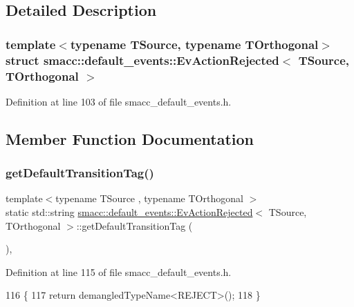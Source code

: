 \subsection{Detailed Description}
\subsubsection*{template$<$typename T\+Source, typename T\+Orthogonal$>$\newline
struct smacc\+::default\+\_\+events\+::\+Ev\+Action\+Rejected$<$ T\+Source, T\+Orthogonal $>$}



Definition at line 103 of file smacc\+\_\+default\+\_\+events.\+h.



\subsection{Member Function Documentation}
\mbox{\label{structsmacc_1_1default__events_1_1EvActionRejected_ad7fcf7986d66cee47b34db537fc17310}} 
\subsubsection{\texorpdfstring{get\+Default\+Transition\+Tag()}{getDefaultTransitionTag()}}
{\footnotesize\ttfamily template$<$typename T\+Source , typename T\+Orthogonal $>$ \\
static std\+::string \hyperlink{structsmacc_1_1default__events_1_1EvActionRejected}{smacc\+::default\+\_\+events\+::\+Ev\+Action\+Rejected}$<$ T\+Source, T\+Orthogonal $>$\+::get\+Default\+Transition\+Tag (\begin{DoxyParamCaption}{ }\end{DoxyParamCaption})\hspace{0.3cm}{\ttfamily [inline]}, {\ttfamily [static]}}



Definition at line 115 of file smacc\+\_\+default\+\_\+events.\+h.


\begin{DoxyCode}
116   \{
117     \textcolor{keywordflow}{return} demangledTypeName<REJECT>();
118   \}
\end{DoxyCode}
\mbox{\label{structsmacc_1_1default__events_1_1EvActionRejected_ad96234edf53fc5bfeddec95630513061}} 
